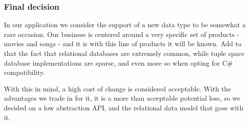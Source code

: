 \subsubsection{Final decision}
In our application we consider the support of a new data type to be somewhat a
rare occasion. Our business is centered around a very specific set of products -
movies and songs - and it is with this line of products it will be known. Add to
that the fact that relational databases are extremely common, while tuple
space database implementations are sparse, and even more so when opting for C\#
compatibility.

With this in mind, a high cost of change is considered acceptable. With the advantages we trade in for
it, it is a more than acceptable potential loss, so we decided on a low abstraction API, and the relational
data model that goes with it.
